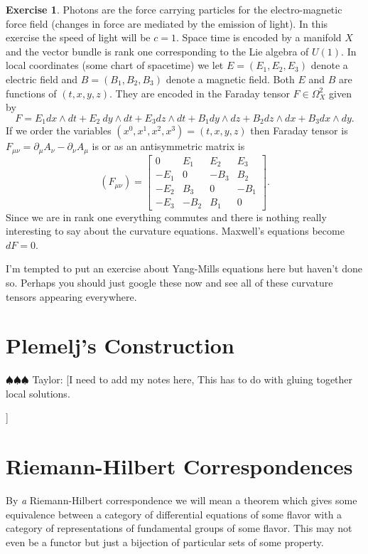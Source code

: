 \documentclass[12pt]{book}
\newcommand{\taylor}[1]{{\color{blue} \sf $\spadesuit\spadesuit\spadesuit$ Taylor: [#1]}}
\numberwithin{equation}{section}
\theoremstyle{definition}
\newtheorem{exercise}[theorem]{Exercise}
\theoremstyle{remark}
\begin{document}
\begin{exercise}
	Photons are the force carrying particles for the electro-magnetic force field (changes in force are mediated by the emission of light). 
	In this exercise the speed of light will be $c=1$.
	Space time is encoded by a manifold $X$ and the vector bundle is rank one corresponding to the Lie algebra of $U(1)$. 
	In local coordinates (some chart of spacetime) we let $E=(E_1,E_2,E_3)$ denote a electric field and $B=(B_1,B_2,B_3)$ denote a magnetic field. 
	Both $E$ and $B$ are functions of $(t,x,y,z)$.
	They are encoded in the Faraday tensor $F\in \Omega^2_X$ given by 
	$$F= E_1dx \wedge dt + E_2\ dy \wedge dt + E_3 dz \wedge dt + B_1 dy \wedge dz + B_2 dz \wedge dx + B_3 dx \wedge dy.$$
	If we order the variables $(x^0,x^1,x^2,x^3)=(t,x,y,z)$ then Faraday tensor is $F_{\mu\nu} = \partial_{\mu}A_{\nu}-\partial_{\nu}A_{\mu}$ is  or as an antisymmetric matrix is
	$$(F_{\mu\nu})=\begin{bmatrix}
	0     &  E_1 &  E_2 &  E_3 \\
	-E_1 &  0     & -B_3   &  B_2    \\
	-E_2 &  B_3  &  0     & -B_1  \\
	-E_3 & -B_2   &  B_1  &  0
	\end{bmatrix}.$$
	Since we are in rank one everything commutes and there is nothing really interesting to say about the curvature equations. 
	Maxwell's equations become $dF=0$.
\end{exercise}

I'm tempted to put an exercise about Yang-Mills equations here but haven't done so. 
Perhaps you should just google these now and see all of these curvature tensors appearing everywhere.

\section{Plemelj's Construction}

\taylor{I need to add my notes here,
This has to do with gluing together local solutions.

}

\section{Riemann-Hilbert Correspondences}\label{S:rhcs}
By \emph{a} Riemann-Hilbert correspondence we will mean a theorem which gives some equivalence between a category of differential equations of some flavor with a category of representations of fundamental groups of some flavor. 
This may not even be a functor but just a bijection of particular sets of some property. 
\end{document}
